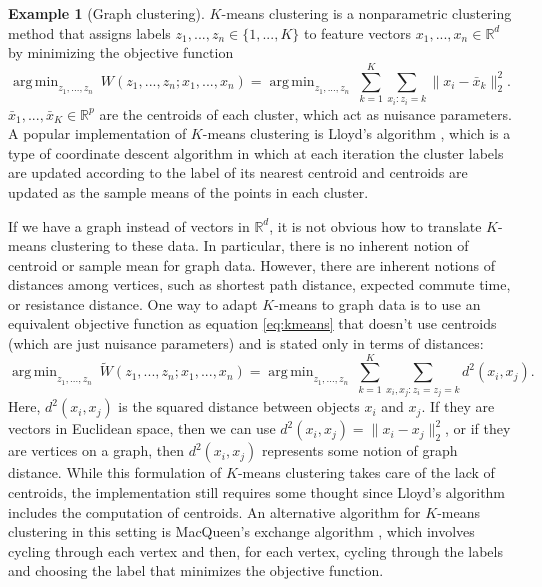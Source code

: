 \documentclass[
  12pt,
]{article}
\theoremstyle{definition}
\theoremstyle{definition}
\newtheorem{example}{Example}[section]
\theoremstyle{definition}
\theoremstyle{definition}
\theoremstyle{remark}
\begin{document}
\begin{example}[Graph clustering]
$K$-means clustering \citep{MacQueen1967} is a nonparametric clustering method that assigns labels $z_1, ..., z_n \in \{1, ..., K\}$ to feature vectors $x_1, ..., x_n \in \mathbb{R}^d$ by minimizing the objective function
\begin{equation}
\label{eq:kmeans}
\mathop{\mathrm{arg\,min}}_{z_1, ..., z_n} ~ W(z_1, ..., z_n; x_1, ..., x_n) = 
\mathop{\mathrm{arg\,min}}_{z_1, ..., z_n} ~ \sum_{k = 1}^K \sum_{x_i : z_i = k} \|x_i - \bar{x}_k\|_2^2.
\end{equation}
$\bar{x}_1, ..., \bar{x}_K \in \mathbb{R}^p$ are the centroids of each cluster, which act as nuisance parameters. 
A popular implementation of $K$-means clustering is Lloyd's algorithm \citep{1056489}, which is a type of coordinate descent algorithm in which at each iteration the cluster labels are updated according to the label of its nearest centroid and centroids are updated as the sample means of the points in each cluster. 

If we have a graph instead of vectors in $\mathbb{R}^d$, it is not obvious how to translate $K$-means clustering to these data. 
In particular, there is no inherent notion of centroid or sample mean for graph data. 
However, there are inherent notions of distances among vertices, such as shortest path distance, expected commute time, or resistance distance. 
One way to adapt $K$-means to graph data is to use an equivalent objective function as equation \eqref{eq:kmeans} that doesn't use centroids (which are just nuisance parameters) and is stated only in terms of distances:  
$$
\mathop{\mathrm{arg\,min}}_{z_1, ..., z_n} ~ \tilde{W}(z_1, ..., z_n; x_1, ..., x_n) =
\mathop{\mathrm{arg\,min}}_{z_1, ..., z_n} ~ \sum_{k=1}^K \sum_{x_i, x_j : z_i = z_j = k}  d^2(x_i, x_j).
$$
Here, $d^2(x_i, x_j)$ is the squared distance between objects $x_i$ and $x_j$. 
If they are vectors in Euclidean space, then we can use $d^2(x_i, x_j) = \|x_i - x_j\|_2^2$, 
or if they are vertices on a graph, then $d^2(x_i, x_j)$ represents some notion of graph distance. 
While this formulation of $K$-means clustering takes care of the lack of centroids, the implementation still requires some thought since Lloyd's algorithm includes the computation of centroids. 
An alternative algorithm for $K$-means clustering in this setting is MacQueen's exchange algorithm \citep{MacQueen1967}, which involves cycling through each vertex and then, for each vertex, cycling through the labels and choosing the label that minimizes the objective function. 


\end{example}
\end{document}
